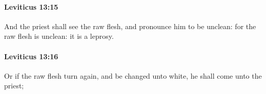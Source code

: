 		\paragraph{Leviticus 13:15} %
			\label{LEVITICUS-13-15}

			And the priest shall see the raw flesh, and pronounce him to be unclean: for the raw flesh is unclean: it is a leprosy.


		\paragraph{Leviticus 13:16} %
			\label{LEVITICUS-13-16}

			Or if the raw flesh turn again, and be changed unto white, he shall come unto the priest;


